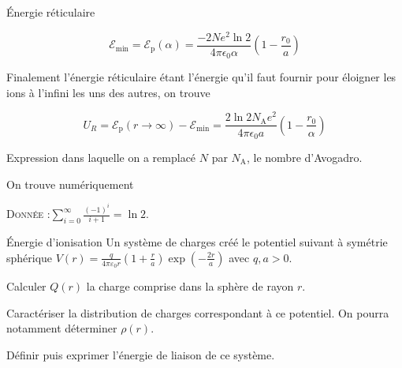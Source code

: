 \begin{exo}[PC][2][TD]{Énergie réticulaire}
\begin{quest}
{$$
\mathscr{E}_{\min }=\mathscr{E}_{\mathrm{p}}(\alpha)=\frac{-2 N e^2 \ln 2}{4 \pi \epsilon_0 \alpha}\left(1-\frac{r_0}{a}\right)
$$


Finalement l'énergie réticulaire étant l'énergie qu'il faut fournir pour éloigner les ions à l'infini les uns des autres, on trouve

$$
U_R=\mathscr{E}_{\mathrm{p}}(r \rightarrow \infty)-\mathscr{E}_{\min }=\frac{2 \ln 2 N_{\mathrm{A}} e^2}{4 \pi \epsilon_0 a}\left(1-\frac{r_0}{\alpha}\right)
$$


Expression dans laquelle on a remplacé $N$ par $N_{\mathrm{A}}$, le nombre d'Avogadro.

On trouve numériquement 
  }
\end{quest}
\textsc{Donnée} :$ \displaystyle\sum_{i=0}^\infty \frac{(-1)^{i}}{i+1}=\ln 2.$
\end{exo}

\begin{exo}[PC][1][devoir]{Énergie d'ionisation}
Un système de charges créé le potentiel suivant à symétrie sphérique $V(r)=\frac{q}{4\pi\varepsilon_0 r}\left(1+\frac{r}{a}\right)\exp\left(-\frac{2r}{a}\right)$ avec $q,a>0$.
\begin{quest}
\item Calculer $Q(r)$ la charge comprise dans la sphère de rayon $r$.
\item Caractériser la distribution de charges correspondant à ce potentiel. On pourra notamment déterminer $\rho(r)$.
\item Définir puis exprimer l'énergie de liaison de ce système.
\end{quest}
\end{exo}


